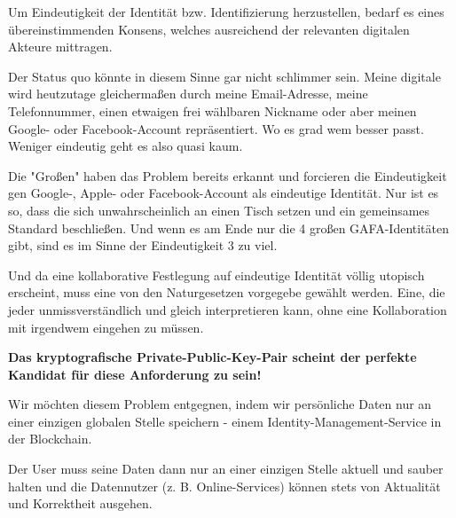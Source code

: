 \vspace{0.3cm}

\begin{Solution}

Um Eindeutigkeit der Identität bzw. Identifizierung herzustellen, bedarf es eines übereinstimmenden Konsens, welches ausreichend der relevanten digitalen Akteure mittragen.

Der Status quo könnte in diesem Sinne gar nicht schlimmer sein. Meine digitale wird heutzutage gleichermaßen durch meine Email-Adresse, meine Telefonnummer, einen etwaigen frei wählbaren Nickname oder aber meinen Google- oder Facebook-Account repräsentiert. Wo es grad wem besser passt. Weniger eindeutig geht es also quasi kaum.

Die "Großen" haben das Problem bereits erkannt und forcieren die Eindeutigkeit gen Google-, Apple- oder Facebook-Account als eindeutige Identität. Nur ist es so, dass die sich unwahrscheinlich an einen Tisch setzen und ein gemeinsames Standard beschließen. Und wenn es am Ende nur die 4 großen GAFA-Identitäten gibt, sind es im Sinne der Eindeutigkeit 3 zu viel.

\vspace{0.2cm}

Und da eine kollaborative Festlegung auf eindeutige Identität völlig utopisch erscheint, muss eine von den Naturgesetzen vorgegebe gewählt werden. Eine, die jeder unmissverständlich und gleich interpretieren kann, ohne eine Kollaboration mit irgendwem eingehen zu müssen.

\vspace{0.2cm}

\textbf{Das kryptografische Private-Public-Key-Pair scheint der perfekte Kandidat für diese Anforderung zu sein!}

\end{Solution}

\vspace{0.3cm}


\begin{Solution}

Wir möchten diesem Problem entgegnen, indem wir persönliche Daten nur an einer einzigen globalen Stelle speichern - einem Identity-Management-Service in der \newline Blockchain.

Der User muss seine Daten dann nur an einer einzigen Stelle aktuell und sauber halten und die Datennutzer (z. B. Online-Services) können stets von Aktualität und Korrektheit ausgehen.

\end{Solution}

